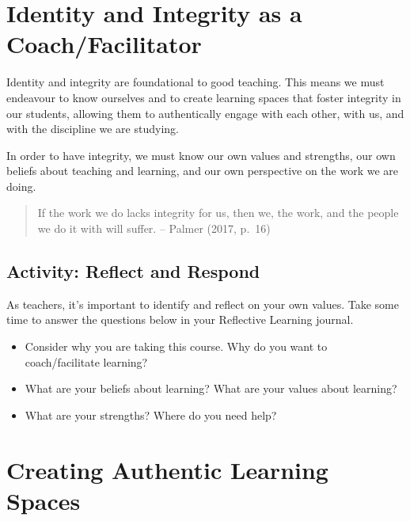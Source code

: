 \documentclass[
]{book}
\providecommand{\tightlist}{%
  \setlength{\itemsep}{0pt}\setlength{\parskip}{0pt}}
\begin{document}
\hypertarget{identity-and-integrity-as-a-coachfacilitator}{%
\section{Identity and Integrity as a Coach/Facilitator}\label{identity-and-integrity-as-a-coachfacilitator}}

Identity and integrity are foundational to good teaching. This means we must endeavour to know ourselves and to create learning spaces that foster integrity in our students, allowing them to authentically engage with each other, with us, and with the discipline we are studying.

In order to have integrity, we must know our own values and strengths, our own beliefs about teaching and learning, and our own perspective on the work we are doing.

\begin{quote}
If the work we do lacks integrity for us, then we, the work, and the people we do it with will suffer. -- Palmer (2017, p.~16)
\end{quote}

\hypertarget{activity-reflect-and-respond}{%
\subsection*{Activity: Reflect and Respond}\label{activity-reflect-and-respond}}

\begin{reflect}
As teachers, it's important to identify and reflect on your own values. Take some time to answer the questions below in your Reflective Learning journal.

\begin{itemize}
\tightlist
\item
  Consider why you are taking this course. Why do you want to coach/facilitate learning?\\
\item
  What are your beliefs about learning? What are your values about learning?\\
\item
  What are your strengths? Where do you need help?
\end{itemize}
\end{reflect}

\hypertarget{creating-authentic-learning-spaces}{%
\section{Creating Authentic Learning Spaces}\label{creating-authentic-learning-spaces}}
\end{document}
